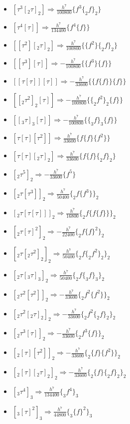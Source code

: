 \documentclass[12pt]{article}
\begin{document}
\begin{itemize}
\begin{itemize}
        \item \([\tau^3[_2\tau]_2]\Rightarrow\frac{h^7}{100800}\{f^3\{_2f\}_2\}\)
        \item \([\tau^4[\tau]]\Rightarrow\frac{h^7}{134400}\{f^4\{f\}\}\)
        \item \([[\tau^2][_2\tau]_2]\Rightarrow\frac{h^7}{100800}\{\{f^2\}\{_2f\}_2\}\)
        \item \([[\tau^3][\tau]]\Rightarrow-\frac{h^7}{100800}\{\{f^3\}\{f\}\}\)
        \item \([[\tau[\tau]][\tau]]\Rightarrow-\frac{h^7}{33600}\{\{f\{f\}\}\{f\}\}\)
        \item \([[_2\tau^2]_2[\tau]]\Rightarrow-\frac{h^7}{100800}\{\{_2f^2\}_2\{f\}\}\)
        \item \([[_3\tau]_3[\tau]]\Rightarrow-\frac{h^7}{100800}\{\{_3f\}_3\{f\}\}\)
        \item \([\tau[\tau][\tau^2]]\Rightarrow\frac{h^7}{33600}\{f\{f\}\{f^2\}\}\)
        \item \([\tau[\tau][_2\tau]_2]\Rightarrow\frac{h^7}{33600}\{f\{f\}\{_2f\}_2\}\)
        \item \([_2\tau^5]_2\Rightarrow-\frac{h^7}{33600}\{f^5\}\)
        \item \([_2\tau[\tau^3]]_2\Rightarrow\frac{h^7}{50400}\{_2f\{f^3\}\}_2\)
        \item \([_2\tau[\tau[\tau]]]_2\Rightarrow\frac{h^7}{16800}\{_2f\{f\{f\}\}\}_2\)
        \item \([_2\tau[\tau]^2]_2\Rightarrow-\frac{h^7}{22400}\{_2f\{f\}^2\}_2\)
        \item \([_2\tau[_2\tau^2]_2]_2\Rightarrow\frac{h^7}{50400}\{_2f\{_2f^2\}_2\}_2\)
        \item \([_2\tau[_3\tau]_3]_2\Rightarrow\frac{h^7}{50400}\{_2f\{_3f\}_3\}_2\)
        \item \([_2\tau^2[\tau^2]]_2\Rightarrow-\frac{h^7}{33600}\{_2f^2\{f^2\}\}_2\)
        \item \([_2\tau^2[_2\tau]_2]_2\Rightarrow-\frac{h^7}{33600}\{_2f^2\{_2f\}_2\}_2\)
        \item \([_2\tau^3[\tau]]_2\Rightarrow-\frac{h^7}{33600}\{_2f^3\{f\}\}_2\)
        \item \([_2[\tau][\tau^2]]_2\Rightarrow-\frac{h^7}{33600}\{_2\{f\}\{f^2\}\}_2\)
        \item \([_2[\tau][_2\tau]_2]_2\Rightarrow-\frac{h^7}{33600}\{_2\{f\}\{_2f\}_2\}_2\)
        \item \([_3\tau^4]_3\Rightarrow\frac{h^7}{134400}\{_3f^4\}_3\)
        \item \([_3[\tau]^2]_3\Rightarrow\frac{h^7}{44800}\{_3\{f\}^2\}_3\)

\end{itemize}
\end{itemize}
\end{document}
